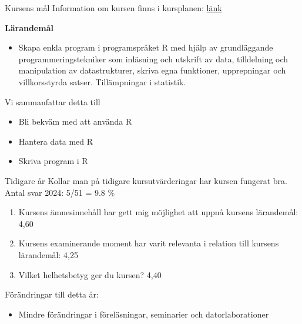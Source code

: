 \documentclass[
  10pt,
  ignorenonframetext,
]{beamer}
\providecommand{\tightlist}{%
  \setlength{\itemsep}{0pt}\setlength{\parskip}{0pt}}
\begin{document}
\begin{frame}{Kursens mål}
\protect\hypertarget{kursens-muxe5l}{}
Information om kursen finns i kursplanen: \href{https://studieinfo.liu.se/kurs/732g33}{länk}

\textbf{Lärandemål}

\begin{itemize}
\tightlist
\item
  Skapa enkla program i programspråket R med hjälp av grundläggande
  programmeringstekniker som inläsning och utskrift av data, tilldelning
  och manipulation av datastrukturer, skriva egna funktioner,
  upprepningar och villkorsstyrda satser. Tillämpningar i statistik.
\end{itemize}

\pause Vi sammanfattar detta till

\begin{itemize}
\tightlist
\item
  Bli bekväm med att använda R
\item
  Hantera data med R
\item
  Skriva program i R
\end{itemize}
\end{frame}

\begin{frame}{Tidigare år}
\protect\hypertarget{tidigare-uxe5r}{}
Kollar man på tidigare kursutvärderingar har kursen fungerat bra. Antal svar 2024: 5/51 = 9.8 \%

\begin{enumerate}
\tightlist
\item
  Kursens ämnesinnehåll har gett mig möjlighet att uppnå kursens
  lärandemål: 4,60
\item
  Kursens examinerande moment har varit relevanta i relation till
  kursens lärandemål: 4,25
\item
  Vilket helhetsbetyg ger du kursen? 4,40
\end{enumerate}

\begin{block}{Förändringar till detta år:}
\protect\hypertarget{fuxf6ruxe4ndringar-till-detta-uxe5r}{}
\begin{itemize}
\tightlist
\item
  Mindre förändringar i föreläsningar, seminarier och datorlaborationer
\end{itemize}
\end{block}
\end{frame}
\end{document}
